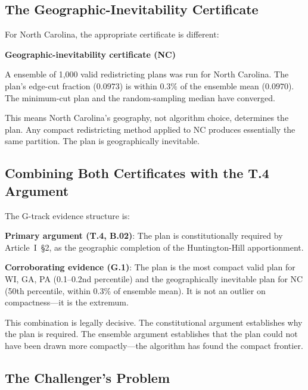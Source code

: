 \subsection{The Geographic-Inevitability Certificate}

For North Carolina, the appropriate certificate is different:

\begin{keybox}
\textbf{Geographic-inevitability certificate (NC)}

A \gc{} \recom{} ensemble of 1,000 valid redistricting plans was run for
North Carolina.  The \ar{} plan's edge-cut fraction ($0.0973$) is within
$0.3\%$ of the ensemble mean ($0.0970$).  The minimum-cut plan and the
random-sampling median have converged.

This means North Carolina's geography, not algorithm choice, determines
the plan.  Any compact redistricting method applied to NC produces
essentially the same partition.  The plan is geographically inevitable.
\end{keybox}

\subsection{Combining Both Certificates with the T.4 Argument}

The G-track evidence structure is:

\begin{keybox}
\textbf{Primary argument (T.4, B.02)}: The \ar{} plan is constitutionally
required by Article~I~\S2, as the geographic completion of the
Huntington-Hill apportionment.

\textbf{Corroborating evidence (G.1)}: The \ar{} plan is the most compact
valid plan for WI, GA, PA (0.1--0.2nd percentile) and the geographically
inevitable plan for NC (50th percentile, within 0.3\% of ensemble mean).
It is not an outlier on compactness---it is the extremum.
\end{keybox}

This combination is legally decisive.  The constitutional argument establishes
why the plan is required.  The ensemble argument establishes that the plan
could not have been drawn more compactly---the algorithm has found the compact
frontier.

\subsection{The Challenger's Problem}

